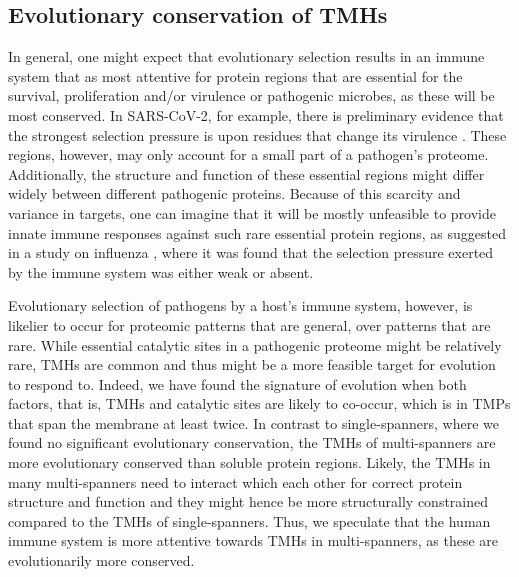 \subsection{Evolutionary conservation of TMHs}

 
In general, one might expect that evolutionary selection results in
an immune system that as most attentive for protein regions that are
essential for the survival, proliferation and/or virulence or pathogenic microbes, 
as these will be most conserved.
In SARS-CoV-2, for example, there is preliminary evidence that the strongest
selection pressure is upon residues that change its 
virulence \cite{velazquez2020positive}.
These regions, however, may only account for a small part of a pathogen's proteome.
Additionally, the structure and function of these essential regions might differ widely between different pathogenic proteins.
Because of this scarcity and variance in targets, 
one can imagine that it will be mostly unfeasible 
to provide innate immune responses against such rare essential protein regions, 
as suggested in a study on influenza \cite{han2019individual},
where it was found that the selection pressure
exerted by the immune system was either weak or absent.
 

Evolutionary selection of pathogens by a host's immune system,
however, is likelier to occur for proteomic patterns that are general,
over patterns that are rare.
While essential catalytic sites in a pathogenic proteome
might be relatively rare, TMHs are common and thus might be a more feasible 
target for evolution to respond to.
Indeed, we have found the signature of evolution when both factors,
that is, TMHs and catalytic sites are likely to co-occur,
which is in TMPs that span the membrane at least twice.
In contrast to single-spanners, where we found no significant evolutionary conservation, the TMHs of multi-spanners are more evolutionary conserved than soluble protein regions. Likely, the TMHs in many multi-spanners need to interact which each other for correct protein structure and function and they might hence be more structurally constrained compared to the TMHs of single-spanners.
Thus, we speculate that the human immune system is more attentive 
towards TMHs in multi-spanners, as these are evolutionarily more conserved. 

